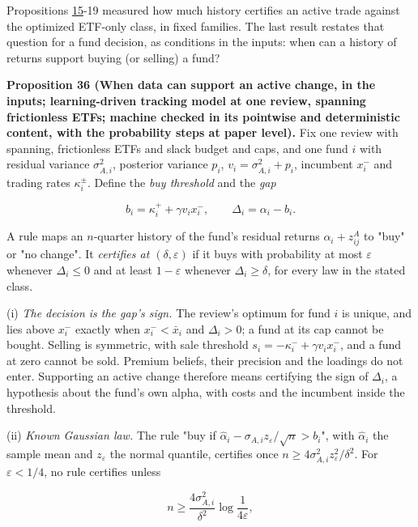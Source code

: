 \documentclass[11pt]{article}
\begin{document}
Propositions \hyperref[res:Proposition-15]{15}-19 measured how much history certifies an active trade
against the optimized ETF-only class, in fixed families. The last
result restates that question for a fund decision, as conditions in the
inputs: when can a history of returns support buying (or selling) a
fund?

\label{res:Proposition-36}
\textbf{Proposition 36 (When data can support an active change, in the inputs; learning-driven tracking model at one review, spanning frictionless ETFs; machine checked in its pointwise and deterministic content, with the probability steps at paper level).}
Fix one review with spanning, frictionless ETFs and slack budget and
caps, and one fund \(i\) with residual variance \(\sigma_{A,i}^2\), posterior
variance \(p_i\), \(v_i=\sigma_{A,i}^2+p_i\), incumbent \(x^-_i\) and trading rates
\(\kappa^\pm_i\). Define the \emph{buy threshold} and the \emph{gap}

\begin{equation*}
b_i=\kappa^+_i+\gamma v_ix^-_i,\qquad \Delta_i=\alpha_i-b_i.\tag{110}\label{eq:110}
\end{equation*}

A rule maps an \(n\)-quarter history of the fund's residual returns
\(\alpha_i+z^A_{ij}\) to "buy" or "no change". It \emph{certifies at \((\delta,\varepsilon)\)} if
it buys with probability at most \(\varepsilon\) whenever \(\Delta_i\leq0\) and at least
\(1-\varepsilon\) whenever \(\Delta_i\geq\delta\), for every law in the stated class.

(i) \emph{The decision is the gap's sign.} The review's optimum for fund \(i\)
is unique, and lies above \(x^-_i\) exactly when \(x^-_i<\bar x_i\) and \(\Delta_i>0\);
a fund at its cap cannot be bought. Selling is symmetric, with sale
threshold \(s_i=-\kappa^-_i+\gamma v_ix^-_i\), and a fund at zero cannot be sold. Premium beliefs, their
precision and the loadings do not enter. Supporting an active change
therefore means certifying the sign of \(\Delta_i\), a hypothesis about the
fund's own alpha, with costs and the incumbent inside the threshold.

(ii) \emph{Known Gaussian law.} The rule "buy if
\(\hat\alpha_i-\sigma_{A,i}z_\varepsilon/\sqrt n>b_i\)", with \(\hat\alpha_i\) the sample mean and \(z_\varepsilon\) the
normal quantile, certifies once \(n\geq4\sigma_{A,i}^2z_\varepsilon^2/\delta^2\). For
\(\varepsilon<1/4\), no rule certifies unless

\begin{equation*}
n\geq\frac{4\sigma_{A,i}^2}{\delta^2}\log\frac1{4\varepsilon},\tag{111}\label{eq:111}
\end{equation*}
\end{document}
